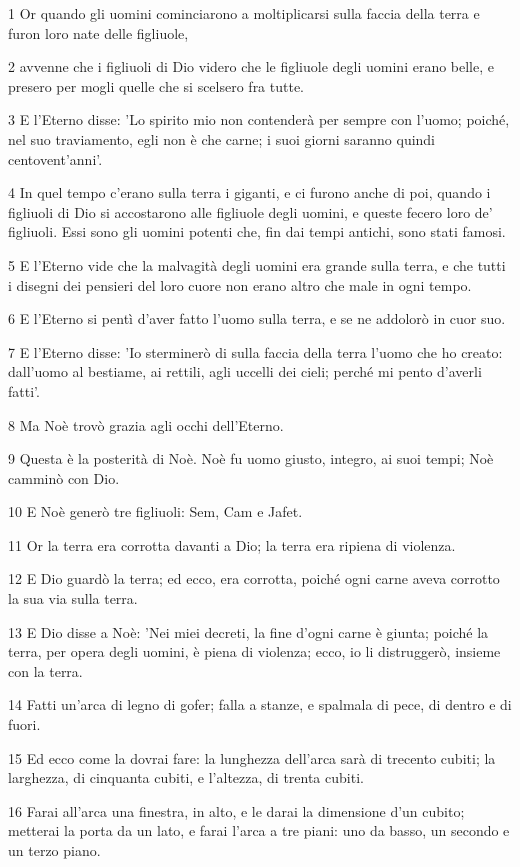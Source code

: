 \par 1 Or quando gli uomini cominciarono a moltiplicarsi sulla faccia della terra e furon loro nate delle figliuole,
\par 2 avvenne che i figliuoli di Dio videro che le figliuole degli uomini erano belle, e presero per mogli quelle che si scelsero fra tutte.
\par 3 E l'Eterno disse: 'Lo spirito mio non contenderà per sempre con l'uomo; poiché, nel suo traviamento, egli non è che carne; i suoi giorni saranno quindi centovent'anni'.
\par 4 In quel tempo c'erano sulla terra i giganti, e ci furono anche di poi, quando i figliuoli di Dio si accostarono alle figliuole degli uomini, e queste fecero loro de' figliuoli. Essi sono gli uomini potenti che, fin dai tempi antichi, sono stati famosi.
\par 5 E l'Eterno vide che la malvagità degli uomini era grande sulla terra, e che tutti i disegni dei pensieri del loro cuore non erano altro che male in ogni tempo.
\par 6 E l'Eterno si pentì d'aver fatto l'uomo sulla terra, e se ne addolorò in cuor suo.
\par 7 E l'Eterno disse: 'Io sterminerò di sulla faccia della terra l'uomo che ho creato: dall'uomo al bestiame, ai rettili, agli uccelli dei cieli; perché mi pento d'averli fatti'.
\par 8 Ma Noè trovò grazia agli occhi dell'Eterno.
\par 9 Questa è la posterità di Noè. Noè fu uomo giusto, integro, ai suoi tempi; Noè camminò con Dio.
\par 10 E Noè generò tre figliuoli: Sem, Cam e Jafet.
\par 11 Or la terra era corrotta davanti a Dio; la terra era ripiena di violenza.
\par 12 E Dio guardò la terra; ed ecco, era corrotta, poiché ogni carne aveva corrotto la sua via sulla terra.
\par 13 E Dio disse a Noè: 'Nei miei decreti, la fine d'ogni carne è giunta; poiché la terra, per opera degli uomini, è piena di violenza; ecco, io li distruggerò, insieme con la terra.
\par 14 Fatti un'arca di legno di gofer; falla a stanze, e spalmala di pece, di dentro e di fuori.
\par 15 Ed ecco come la dovrai fare: la lunghezza dell'arca sarà di trecento cubiti; la larghezza, di cinquanta cubiti, e l'altezza, di trenta cubiti.
\par 16 Farai all'arca una finestra, in alto, e le darai la dimensione d'un cubito; metterai la porta da un lato, e farai l'arca a tre piani: uno da basso, un secondo e un terzo piano.
